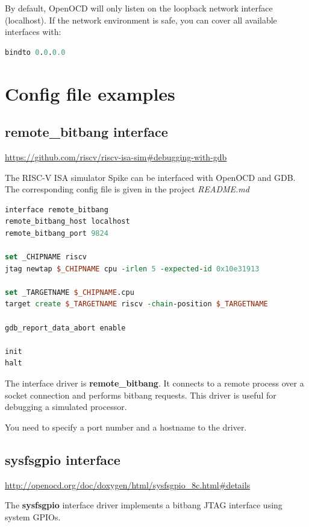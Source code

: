 \documentclass{article}
\begin{document}
    By default, OpenOCD will only listen on the loopback network interface (localhost). If the network environment is safe, you can cover all available interfaces with:
    
    \begin{lstlisting}[language=tcl]
    bindto 0.0.0.0
    \end{lstlisting}
    
    \newpage
    \section{Config file examples}
    
    \subsection{remote\_bitbang interface}
    
    \url{https://github.com/riscv/riscv-isa-sim#debugging-with-gdb}
    
    The RISC-V ISA simulator Spike can be interfaced with OpenOCD and GDB. The corresponding config file is given in the project \textit{README.md}
    
    \begin{lstlisting}[language=tcl]
interface remote_bitbang
remote_bitbang_host localhost
remote_bitbang_port 9824

set _CHIPNAME riscv
jtag newtap $_CHIPNAME cpu -irlen 5 -expected-id 0x10e31913

set _TARGETNAME $_CHIPNAME.cpu
target create $_TARGETNAME riscv -chain-position $_TARGETNAME

gdb_report_data_abort enable

init
halt
    \end{lstlisting}
    
    The interface driver is \textbf{remote\_bitbang}. It connects to a remote process over a socket connection and performs bitbang requests. This driver is useful for debugging a simulated processor.
    
    You need to specify a port number and a hostname to the driver.
    
    \subsection{sysfsgpio interface}
    
    \url{http://openocd.org/doc/doxygen/html/sysfsgpio_8c.html#details}
    
    The \textbf{sysfsgpio} interface driver implements a bitbang JTAG interface using system GPIOs.
    
\end{document}
